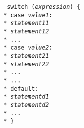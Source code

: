 \begin{flushleft}
\tt
switch ({\em expression}\/) \{ \\*
{\hspace{8pt}}case {\em value1}\/: \\*
{\hspace{8pt}}{\hspace{8pt}}{\em statement11}\/ \\*
{\hspace{8pt}}{\hspace{8pt}}{\em statement12}\/ \\*
{\hspace{8pt}}{\hspace{8pt}}... \\*
{\hspace{8pt}}case {\em value2}\/: \\*
{\hspace{8pt}}{\hspace{8pt}}{\em statement21}\/ \\*
{\hspace{8pt}}{\hspace{8pt}}{\em statement22}\/ \\*
{\hspace{8pt}}{\hspace{8pt}}... \\*
{\hspace{8pt}}... \\*
{\hspace{8pt}}default: \\*
{\hspace{8pt}}{\hspace{8pt}}{\em statementd1}\/ \\*
{\hspace{8pt}}{\hspace{8pt}}{\em statementd2}\/ \\*
{\hspace{8pt}}{\hspace{8pt}}... \\*
\} 
\end{flushleft}


